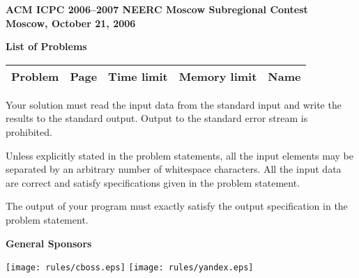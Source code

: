 \documentclass[11pt,oneside]{article}
\begin{document}
\renewcommand{\contestname}{ACM ICPC 2006--2007, NEERC, Moscow Subregional Contest}
\renewcommand{\contestdate}{Moscow, October 21, 2006}

\begin{center}
\LARGE\bf ACM ICPC 2006--2007 NEERC Moscow Subregional Contest\\
Moscow, October 21, 2006
\end{center}

\renewcommand{\tour}{}
\begin{center}
{\Large\textbf{List of Problems}}
\end{center}

\newcommand{\probtableline}[1]{%
\probletter{#1}&\probpage{#1}&\probtime{#1}&\probmem{#1}&\probname{#1}}

{\large
\begin{center}
\begin{tabular}{|c|c|p{2cm}|p{2cm}|p{6.5cm}|}
\hline
Problem & Page & Time limit & Memory limit & Name \\
\hline

\hline
\end{tabular}
\end{center}}

{\large
Your solution must read the input data from the standard input and
write the results to the standard output. Output to the standard
error stream is prohibited.

Unless explicitly stated in the problem statements, all the input
elements may be separated by an arbitrary number of whitespace characters.
All the input data are correct and satisfy specifications given in the
problem statement.

The output of your program must exactly satisfy the output specification
in the problem statement.
}

\begin{center}
\Large\bf General Sponsors
\end{center}

\begin{center}
\texttt{[image: rules/cboss.eps]}
\texttt{[image: rules/yandex.eps]}
\end{center}

\newpage


\end{document}
